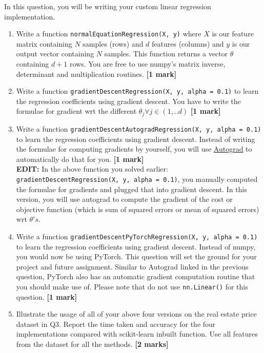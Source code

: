 \documentclass[colorlinks,linkcolor=true]{article}
\begin{document}
\item In this question, you will be writing your custom linear regression implementation. 
\begin{enumerate}
	\item Write a function \texttt{normalEquationRegression(X, y)} where $X$ is our feature matrix containing $N$ samples (rows) and $d$ features (columns) and $y$ is our output vector containing $N$ samples. This function returns a vector $\theta$ containing $d+1$ rows. You are free to use numpy's matrix inverse, determinant and multiplication routines. \textbf{[1 mark]}
	\item Write a function \texttt{gradientDescentRegression(X, y, alpha = 0.1)} to learn the regression coefficients using gradient descent. You have to write the formulae for gradient wrt the different $\theta_j \forall j \in (1, ..d)$ \textbf{[1 mark]}
	\item Write a function \texttt{gradientDescentAutogradRegression(X, y, alpha = 0.1)} to learn the regression coefficients using gradient descent. Instead of writing the formulae for computing gradients by yourself, you will use \href{https://github.com/HIPS/autograd}{Autograd} to automatically do that for you. \textbf{[1 mark]} \\
		\textbf{EDIT:}  In the above function you solved earlier: \texttt{gradientDescentRegression(X, y, alpha = 0.1)}, you manually computed the formulae for gradients and plugged that into gradient descent. In this version, you will use autograd to compute the gradient of the cost or objective function (which is sum of squared errors or mean of squared errors) wrt $\theta's$.

	\item Write a function \texttt{gradientDescentPyTorchRegression(X, y, alpha = 0.1)} to learn the regression coefficients using gradient descent. Instead of numpy, you would now be using PyTorch. This question will set the ground for your project and future assignment. Similar to Autograd linked in the previous question, PyTorch also has an automatic gradient computation routine that you should make use of. Please note that do not use \texttt{nn.Linear()} for this question. \textbf{[1 mark]}
	\item Illustrate the usage of all of your above four versions on the real estate price dataset in Q3. Report the time taken and accuracy for the four implementations compared with scikit-learn inbuilt function. Use all features from the dataset for all the methods. \textbf{[2 marks]}
\end{enumerate}
\end{document}
